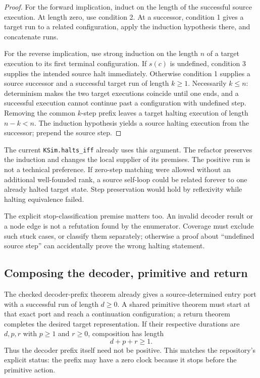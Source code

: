 \documentclass[11pt]{article}
\newcommand{\code}[1]{\texttt{\small #1}}
\begin{document}
\begin{proof}
For the forward implication, induct on the length of the successful source execution. At length zero, use condition 2. At a successor, condition 1 gives a target run to a related configuration, apply the induction hypothesis there, and concatenate runs.

For the reverse implication, use strong induction on the length $n$ of a target execution to its first terminal configuration. If $s(c)$ is undefined, condition 3 supplies the intended source halt immediately. Otherwise condition 1 supplies a source successor and a successful target run of length $k\geq1$. Necessarily $k\leq n$: determinism makes the two target executions coincide until one ends, and a successful execution cannot continue past a configuration with undefined step. Removing the common $k$-step prefix leaves a target halting execution of length $n-k<n$. The induction hypothesis yields a source halting execution from the successor; prepend the source step.
\end{proof}

The current \code{KSim.halts\_iff} already uses this argument. The refactor preserves the induction and changes the local supplier of its premises. The positive run is not a technical preference. If zero-step matching were allowed without an additional well-founded rank, a source self-loop could be related forever to one already halted target state. Step preservation would hold by reflexivity while halting equivalence failed.

The explicit stop-classification premise matters too. An invalid decoder result or a node edge is not a refutation found by the enumerator. Coverage must exclude such stuck cases, or classify them separately; otherwise a proof about ``undefined source step'' can accidentally prove the wrong halting statement.

\subsection{Composing the decoder, primitive and return}

The checked decoder-prefix theorem already gives a source-determined entry port with a successful run of length $d\geq0$. A shared primitive theorem must start at that exact port and reach a continuation configuration; a return theorem completes the desired target representation. If their respective durations are $d,p,r$ with $p\geq1$ and $r\geq0$, composition has length
\[
 d+p+r\geq1.
\]
Thus the decoder prefix itself need not be positive. This matches the repository's explicit status: the prefix may have a zero clock because it stops before the primitive action.
\end{document}
